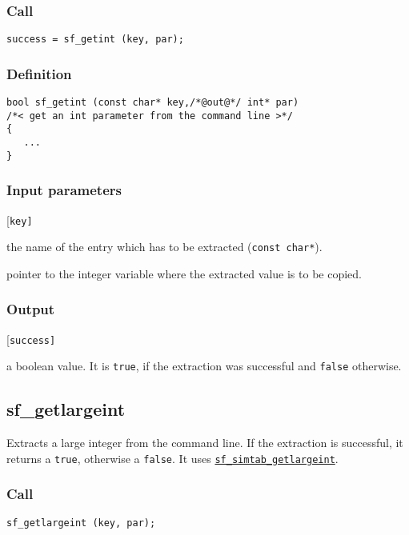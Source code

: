 \subsubsection*{Call}
\begin{verbatim}success = sf_getint (key, par);\end{verbatim}

\subsubsection*{Definition}
\begin{verbatim}
bool sf_getint (const char* key,/*@out@*/ int* par) 
/*< get an int parameter from the command line >*/
{
   ...
}
\end{verbatim}

\subsubsection*{Input parameters}
\begin{desclist}{\tt }{\quad}[\tt key]
   \setlength\itemsep{0pt}
   \item[key] the name of the entry which has to be extracted (\texttt{const char*}).
   \item[par] pointer to the integer variable where the extracted value is to be copied.
\end{desclist}

\subsubsection*{Output}
\begin{desclist}{\tt }{\quad}[\tt success]
   \setlength\itemsep{0pt}
   \item[success] a boolean value. It is \texttt{true}, if the extraction was successful and \texttt{false} otherwise. 
\end{desclist}




\subsection{{sf\_getlargeint}}
Extracts a large integer from the command line. If the extraction is successful, it returns a \texttt{true}, otherwise a \texttt{false}.  
It uses \hyperref[sec:sf_simtab_getlargeint]{\texttt{sf\_simtab\_getlargeint}}.

\subsubsection*{Call}
\begin{verbatim}sf_getlargeint (key, par);\end{verbatim}

